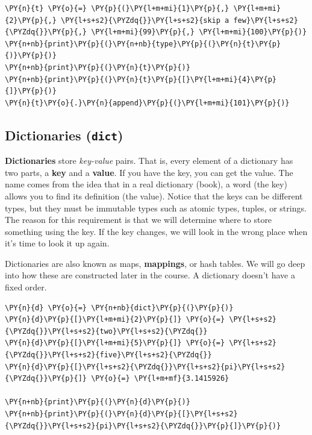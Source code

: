 \begin{Verbatim}[commandchars=\\\{\}]
\PY{n}{t} \PY{o}{=} \PY{p}{(}\PY{l+m+mi}{1}\PY{p}{,} \PY{l+m+mi}{2}\PY{p}{,} \PY{l+s+s2}{\PYZdq{}}\PY{l+s+s2}{skip a few}\PY{l+s+s2}{\PYZdq{}}\PY{p}{,} \PY{l+m+mi}{99}\PY{p}{,} \PY{l+m+mi}{100}\PY{p}{)}
\PY{n+nb}{print}\PY{p}{(}\PY{n+nb}{type}\PY{p}{(}\PY{n}{t}\PY{p}{)}\PY{p}{)}
\PY{n+nb}{print}\PY{p}{(}\PY{n}{t}\PY{p}{)}
\PY{n+nb}{print}\PY{p}{(}\PY{n}{t}\PY{p}{[}\PY{l+m+mi}{4}\PY{p}{]}\PY{p}{)}
\PY{n}{t}\PY{o}{.}\PY{n}{append}\PY{p}{(}\PY{l+m+mi}{101}\PY{p}{)}
\end{Verbatim}


\subsection{Dictionaries (\texttt{dict})}


\textbf{Dictionaries} store \emph{key-value} pairs.  That is, every element of a dictionary has two parts, a \textbf{key} and a \textbf{value}.  If you have the key, you can get the value.  The name comes from the idea that in a real dictionary (book), a word (the key) allows you to find its definition (the value).  Notice that the keys can be different types, but they must be immutable types such as atomic types, tuples, or strings.  The reason for this requirement is that we will determine where to store something using the key.  If the key changes, we will look in the wrong place when it's time to look it up again.


Dictionaries are also known as maps,  \textbf{mappings}, or hash tables.  We will go deep into how these are constructed later in the course.
A dictionary doesn't have a fixed order.

\begin{Verbatim}[commandchars=\\\{\}]
\PY{n}{d} \PY{o}{=} \PY{n+nb}{dict}\PY{p}{(}\PY{p}{)}
\PY{n}{d}\PY{p}{[}\PY{l+m+mi}{2}\PY{p}{]} \PY{o}{=} \PY{l+s+s2}{\PYZdq{}}\PY{l+s+s2}{two}\PY{l+s+s2}{\PYZdq{}}
\PY{n}{d}\PY{p}{[}\PY{l+m+mi}{5}\PY{p}{]} \PY{o}{=} \PY{l+s+s2}{\PYZdq{}}\PY{l+s+s2}{five}\PY{l+s+s2}{\PYZdq{}}
\PY{n}{d}\PY{p}{[}\PY{l+s+s2}{\PYZdq{}}\PY{l+s+s2}{pi}\PY{l+s+s2}{\PYZdq{}}\PY{p}{]} \PY{o}{=} \PY{l+m+mf}{3.1415926}

\PY{n+nb}{print}\PY{p}{(}\PY{n}{d}\PY{p}{)}
\PY{n+nb}{print}\PY{p}{(}\PY{n}{d}\PY{p}{[}\PY{l+s+s2}{\PYZdq{}}\PY{l+s+s2}{pi}\PY{l+s+s2}{\PYZdq{}}\PY{p}{]}\PY{p}{)}
\end{Verbatim}


